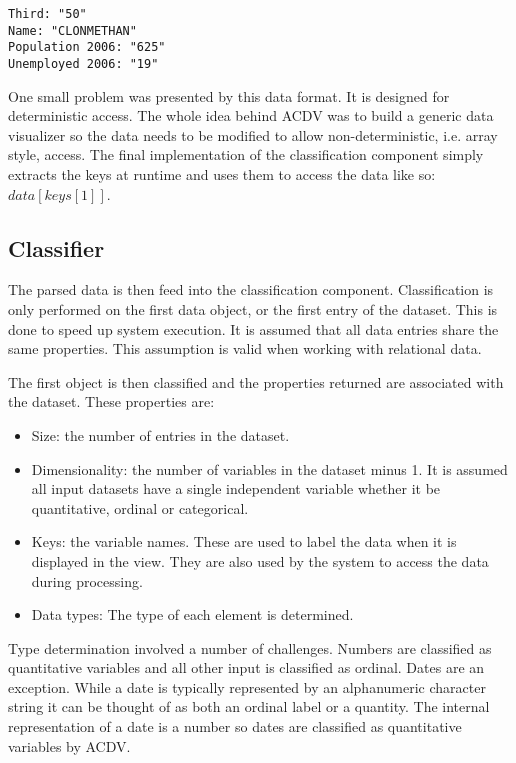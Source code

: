 \documentclass[a4paper, 11pt, titlepage, onehalfspacing]{report}
\begin{document}
\begin{verbatim}
Third: "50"
Name: "CLONMETHAN"
Population 2006: "625"
Unemployed 2006: "19"
\end{verbatim}

One small problem was presented by this data format. It is designed for deterministic access. The whole idea behind AC\lightning{}DV was to build a generic data visualizer so the data needs to be modified to allow non-deterministic, i.e. array style, access. The final implementation of the classification component simply extracts the keys at runtime and uses them to access the data like so: $data[keys[1]]$.  


\subsection{Classifier}
The parsed data is then feed into the classification component. Classification is only performed on the first data object, or the first entry of the dataset. This is done to speed up system execution. It is assumed that all data entries share the same properties. This assumption is valid when working with relational data.

The first object is then classified and the properties returned are associated with the dataset. These properties are:
\begin{itemize}
\item Size: the number of entries in the dataset.
\item Dimensionality: the number of variables in the dataset minus 1. It is assumed all input datasets have a single independent variable whether it be quantitative, ordinal or categorical.
\item Keys: the variable names. These are used to label the data when it is displayed in the view. They are also used by the system to access the data during processing.
\item Data types: The type of each element is determined. 
\end{itemize}

Type determination involved a number of challenges. Numbers are classified as quantitative variables and all other input is classified as ordinal. Dates are an exception. While a date is typically represented by an alphanumeric character string it can be thought of as both an ordinal label or a quantity. The internal representation of a date is a number so dates are classified as quantitative variables by AC\lightning{}DV. 
\end{document}
